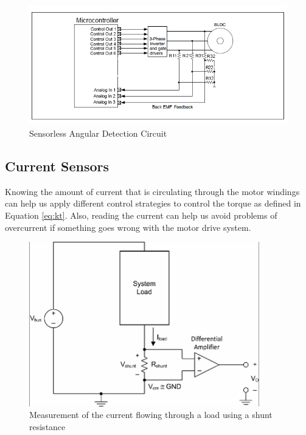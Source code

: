 \begin{figure}[htbp]
\centering
\includegraphics[width=\textwidth]{Images/sensorless_position.png} 
\caption[Sensorless Angular Detection]{Sensorless Angular Detection Circuit}
\label{fig:hall_effect}
\end{figure}

\subsection{Current Sensors}

Knowing the amount of current that is circulating through the motor windings can help us apply different control strategies to control the torque as defined in Equation \ref{eq:kt}. Also, reading the current can help us avoid problems of overcurrent if something goes wrong with the motor drive system.

\begin{figure}[htbp]
\centering
\includegraphics[width=10cm]{Images/shunt_amp.png} 
\caption[Shunt Resistance Current Detection]{Measurement of the current flowing through a load using a shunt resistance}
\label{fig:shunt_amp}
\end{figure}

